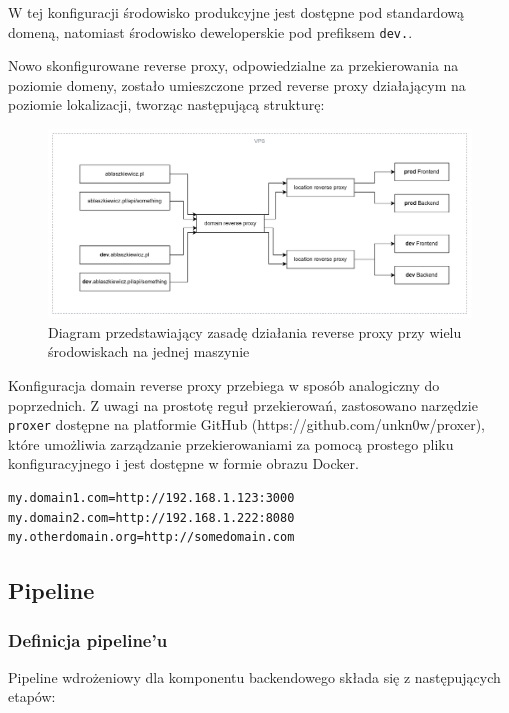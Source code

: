 \documentclass{article}
\begin{document}
W tej konfiguracji środowisko produkcyjne jest dostępne pod standardową domeną, natomiast środowisko deweloperskie pod prefiksem \lstinline|dev.|.

Nowo skonfigurowane reverse proxy, odpowiedzialne za przekierowania na poziomie domeny, zostało umieszczone przed reverse proxy działającym na poziomie lokalizacji, tworząc następującą strukturę:

\begin{figure}[H]
    \centering
    \includegraphics[width=1\linewidth]{domainReverseProxy.png}
    \caption{Diagram przedstawiający zasadę działania reverse proxy przy wielu środowiskach na jednej maszynie}
    \label{fig:enter-label}
\end{figure}

Konfiguracja domain reverse proxy przebiega w sposób analogiczny do poprzednich. Z uwagi na prostotę reguł przekierowań, zastosowano narzędzie \lstinline|proxer| dostępne na platformie GitHub (https://github.com/unkn0w/proxer), które umożliwia zarządzanie przekierowaniami za pomocą prostego pliku konfiguracyjnego i jest dostępne w formie obrazu Docker.

\begin{lstlisting}[caption=Plik \lstinline|/infrastructure/reverse-proxy/src/nxconf.sh|]
my.domain1.com=http://192.168.1.123:3000
my.domain2.com=http://192.168.1.222:8080
my.otherdomain.org=http://somedomain.com
\end{lstlisting}

\subsection{Pipeline}

\subsubsection{Definicja pipeline'u}

Pipeline wdrożeniowy dla komponentu backendowego składa się z następujących etapów:
\end{document}
